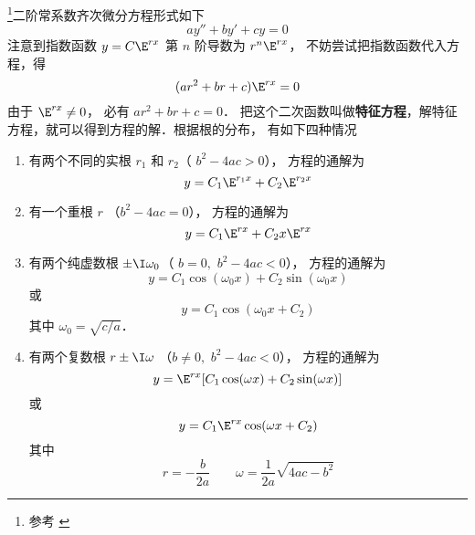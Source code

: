 

\begin{issues}
\end{issues}

\footnote{参考 \cite{同济高}}二阶常系数齐次微分方程形式如下
\begin{equation}
ay'' + by' + cy = 0
\end{equation}
注意到指数函数 $y = C \E^{rx}$ 第 $n$ 阶导数为 $r^n \E^{rx}$， 不妨尝试把指数函数代入方程，得
\begin{equation}
(a r^2 + br + c) \E^{rx} = 0
\end{equation}
由于 $\E^{rx} \ne 0$， 必有 $a r^2 + br + c = 0$． 把这个二次函数叫做\textbf{特征方程}，解特征方程，就可以得到方程的解．根据根的分布， 有如下四种情况

\begin{enumerate}
\item 有两个不同的实根 $r_1$ 和  $r_2$（ $b^2 - 4ac > 0$）， 方程的通解为
 \begin{equation}
y = C_1 \E^{r_1 x} + C_2 \E^{r_2 x}
\end{equation}
\item 有一个重根 $r$ （$b^2 - 4ac = 0$）， 方程的通解为
\begin{equation}\label{Ode2_eq4}
y = C_1 \E^{rx} + C_2 x \E^{rx}
\end{equation}
\item 有两个纯虚数根 $\pm \I \omega_0$（ $b = 0,\,\, b^2 - 4ac < 0$）， 方程的通解为
\begin{equation}
y = C_1\cos(\omega_0 x) + C_2 \sin(\omega_0 x)
\end{equation}
或 
\begin{equation}
y = C_1\cos(\omega_0 x + C_2)
\end{equation} 
其中 $\omega_0 = \sqrt{c/a}$． 

\item 有两个复数根 $r \pm \I\omega$ （$b \ne 0,\,\, b^2 - 4ac < 0$）， 方程的通解为
\begin{equation}\label{Ode2_eq7}
y = \E^{rx} [ C_1\cos(\omega x) + C_2\sin(\omega x) ]
\end{equation} 
或 
\begin{equation}
y = C_1\E^{rx}\cos(\omega x + C_2)
\end{equation} 
其中
\begin{equation}
r =  - \frac{b}{2a} \qquad \omega  = \frac{1}{2a}\sqrt{4ac - b^2} 
\end{equation}

\end{enumerate}

